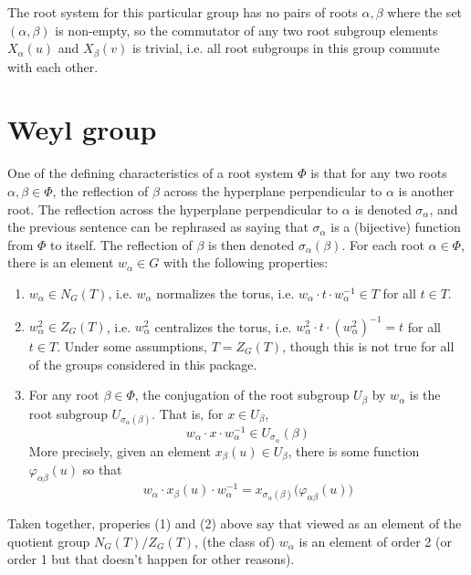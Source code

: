 \documentclass[11pt]{article}
\newcommand{\inv}{^{-1}}
\newcommand{\sig}{\sigma}
\theoremstyle{definition}
\begin{document}
\else
The root system for this particular group has no pairs of roots $\alpha, \beta$ where the set $(\alpha, \beta)$ is non-empty, so the commutator of any two root subgroup elements $X_\alpha(u)$ and $X_\beta(v)$ is trivial, i.e. all root subgroups in this group commute with each other.
\fi

\newpage
\section{Weyl group}

One of the defining characteristics of a root system $\Phi$ is that for any two roots $\alpha, \beta \in \Phi$, the reflection of $\beta$ across the hyperplane perpendicular to $\alpha$ is another root. The reflection across the hyperplane perpendicular to $\alpha$ is denoted $\sig_\alpha$, and the previous sentence can be rephrased as saying that $\sig_\alpha$ is a (bijective) function from $\Phi$ to itself. The reflection of $\beta$ is then denoted $\sig_\alpha(\beta)$. For each root $\alpha \in \Phi$, there is an element $w_\alpha \in G$ with the following properties:
\begin{enumerate}
	\item $w_\alpha \in N_G(T)$, i.e. $w_\alpha$ normalizes the torus, i.e. $w_\alpha \cdot t \cdot w_\alpha \inv \in T$ for all $t \in T$.
	\item $w_\alpha^2 \in Z_G(T)$, i.e. $w_\alpha^2$ centralizes the torus, i.e. $w_\alpha^2 \cdot t \cdot (w_\alpha^2) \inv = t$ for all $t \in T$. Under some assumptions, $T = Z_G(T)$, though this is not true for all of the groups considered in this package.
	\item For any root $\beta \in \Phi$, the conjugation of the root subgroup $U_\beta$ by $w_\alpha$ is the root subgroup $U_{\sig_\alpha(\beta)}$. That is, for $x \in U_\beta$,
	\[
		w_\alpha \cdot x \cdot w_\alpha \inv \in U_{\sig_{\alpha}}(\beta)
	\]
	More precisely, given an element $x_\beta(u) \in U_\beta$, there is some function $\varphi_{\alpha \beta}(u)$ so that
	\[
		w_\alpha \cdot x_\beta(u) \cdot w_\alpha \inv = x_{\sig_{\alpha}(\beta)} \Big( \varphi_{\alpha \beta}(u) \Big)
	\]
\end{enumerate}
Taken together, properies (1) and (2) above say that viewed as an element of the quotient group $N_G(T)/Z_G(T)$, (the class of) $w_\alpha$ is an element of order 2 (or order 1 but that doesn't happen for other reasons).
\end{document}
